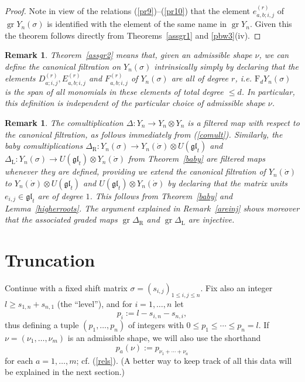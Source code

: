\documentclass[twoside,12pt,reqno]{amsart}
\newtheorem{Remark}[Proposition]{Remark}
\def\rt{{\operatorname{\scriptscriptstyle R}}}
\def\lt{{\operatorname{\scriptscriptstyle L}}}
\def\F{\mathrm{F}}
\def\gr{\operatorname{gr}}
\begin{document}
\begin{proof}
Note in view of the relations (\ref{pr9})--(\ref{pr10}) that
the element $e_{a,b;i,j}^{(r)}$ of
$\gr Y_n(\sigma)$ is identified with the element of the same
name in $\gr Y_n$.
Given this the theorem follows
directly from Theorems~\ref{assgr1} and \ref{pbw3}(iv).
\end{proof}

\begin{Remark}\label{simply}\rm
Theorem~\ref{assgr2} means that, given an admissible shape $\nu$,
we can define the canonical filtration
on $Y_n(\sigma)$ intrinsically simply by declaring that the
elements $D_{a;i,j}^{(r)}, E_{a,b;i,j}^{(r)}$
and $F_{a,b;i,j}^{(r)}$ of $Y_n(\sigma)$ are all of degree $r$, i.e. $\F_d
Y_n(\sigma)$ is the span of all monomials in these elements of total
degree $\leq d$.
In particular, this definition is independent of the
particular choice of admissible shape $\nu$.
\end{Remark}

\begin{Remark}\label{sumply}
\rm
The comultiplication $\Delta:Y_n \rightarrow Y_n \otimes Y_n$
is a filtered map with respect to the canonical filtration,
as follows immediately from 
(\ref{comult}).
Similarly, 
the baby comultiplications
$\Delta_{\rt}:Y_n(\sigma) \rightarrow Y_n(\dot\sigma)\otimes 
U(\mathfrak{gl}_t)$
and $\Delta_\lt:Y_n(\sigma) \rightarrow U(\mathfrak{gl}_t)\otimes
Y_n(\dot\sigma)$ 
from Theorem~\ref{baby} are filtered maps whenever they are defined,
providing we extend the canonical filtration 
of $Y_n(\dot\sigma)$
to
$Y_n(\dot\sigma)\otimes 
U(\mathfrak{gl}_t)$
and 
$U(\mathfrak{gl}_t)\otimes Y_n(\dot\sigma)$
by declaring that the matrix units $e_{i,j} \in \mathfrak{gl}_t$
are of degree $1$.
This follows from Theorem~\ref{baby} and Lemma~\ref{higherroots}.
The argument explained in Remark~\ref{areinj} shows moreover that the
associated graded maps 
$\gr \Delta_\rt$ and $\gr \Delta_\lt$ are injective.
\end{Remark}



\section{Truncation}\label{struncation}

Continue with a fixed
shift matrix $\sigma = (s_{i,j})_{1 \leq i,j \leq n}$.
Fix also an integer $l \geq  
s_{1,n}+s_{n,1}$ (the ``level''), 
and for $i=1,\dots,n$ let
\begin{equation}\label{pidef}
p_i := l -s_{i,n} - s_{n,i},
\end{equation}
thus defining a tuple $(p_1,\dots,p_n)$ of
integers with $0 \leq p_1 \leq \cdots \leq p_n = l$.
If $\nu = (\nu_1,\dots,\nu_m)$ is an admissible shape, we will
also use the shorthand
\begin{equation}\label{padef}
p_a(\nu) := p_{\nu_1+\cdots+\nu_a}
\end{equation}
for each $a=1,\dots,m$; cf. (\ref{rels}).
(A better way to keep track of all this data will be explained in the next
section.)
\end{document}
